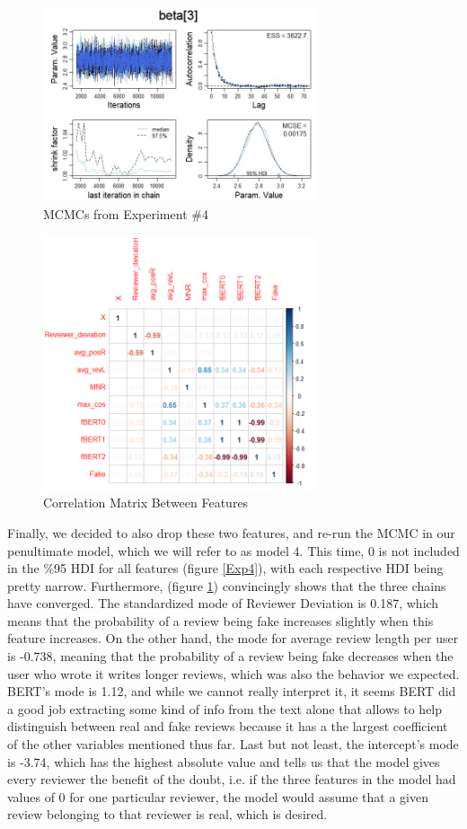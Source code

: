 \documentclass[man, floatsintext, 10pt]{apa6}
\begin{document}
\begin{figure}
\includegraphics[width=8cm]{BERTExp4.jpg}
\caption{MCMCs from Experiment \#4}
  \label{Exp4MCMC}
\end{figure}

\begin{figure}
\includegraphics[width=8cm]{corrplot.png}
\caption{Correlation Matrix Between Features}
  \label{corr}
\end{figure}





Finally, we decided to also drop these two features, and re-run the MCMC in our penultimate model, which we will refer to as model 4. This time,  0 is not included in the \%95 HDI for all features (figure \ref{Exp4}), with each respective HDI being pretty narrow. Furthermore, (figure \ref{Exp4MCMC}) convincingly shows that the three chains have converged.  The standardized  mode of Reviewer Deviation is 0.187, which means that the probability of a review being fake increases slightly when this feature increases. On the other hand, the mode for average review length per user is -0.738, meaning that the probability of a review being fake decreases when the user who wrote it writes longer reviews, which was also the behavior we expected. BERT's mode is 1.12, and while we cannot really interpret it, it seems BERT did a good job extracting some kind of info from the text alone that allows to help distinguish between real and fake reviews because it has a the largest coefficient of the other variables mentioned thus far. Last but not least, the intercept's mode is -3.74, which has the highest absolute value and tells us that the model gives every reviewer the benefit of the doubt, i.e. if the three features in the model had values of 0 for one particular reviewer, the model would assume that a given review belonging to that reviewer is real, which is desired.
\end{document}
